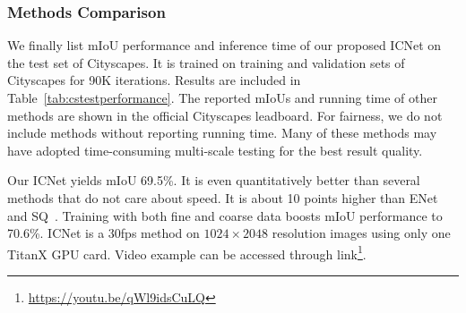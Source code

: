 \documentclass[runningheads]{llncs}
\begin{document}
\subsubsection{Methods Comparison}
We finally list mIoU performance and inference time of our proposed ICNet on the test set of Cityscapes. It is trained on training and validation sets of Cityscapes for 90K iterations. Results are included in Table~\ref{tab:cstestperformance}. The reported mIoUs and running time of other methods are shown in the official Cityscapes leadboard. For fairness, we do not include methods without reporting running time. Many of these methods may have adopted time-consuming multi-scale testing for the best result quality.

Our ICNet yields mIoU 69.5\%. It is even quantitatively better than several methods that do not care about speed. It is about 10 points higher than ENet \cite{paszke2016enet} and SQ~\cite{treml2016speeding}. Training with both fine and coarse data boosts mIoU performance to 70.6\%.  ICNet is a 30fps method on $1024 \times 2048$ resolution images using only one TitanX GPU card. Video example can be accessed through link\footnote{\href{https://youtu.be/qWl9idsCuLQ}{https://youtu.be/qWl9idsCuLQ}}.
\end{document}
